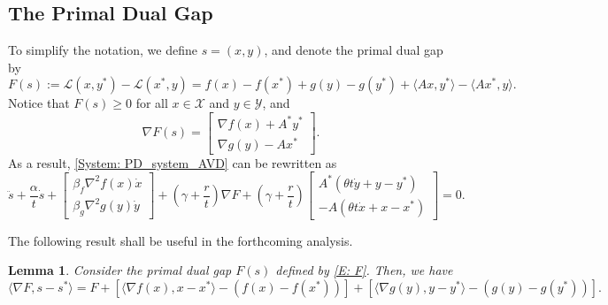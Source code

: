 \documentclass[pdflatex,sn-mathphys-num]{sn-jnl}
\theoremstyle{thmstyleone}
\newtheorem{lemma}[theorem]{Lemma}
\theoremstyle{thmstyletwo}
\theoremstyle{thmstylethree}
\newcommand{\X}{\mathcal{X}}
\newcommand{\Y}{\mathcal{Y}}
\begin{document}
\subsection{The Primal Dual Gap}\label{Subsec: F}
To simplify the notation, we define $s=(x,y)$, and denote the primal dual gap by 
\begin{equation}\label{E: F}
F(s):= \mathcal{L}(x,y^*) - \mathcal{L}(x^*,y) = f(x) - f(x^*) + g(y) - g(y^*) + \langle Ax, y^* \rangle - \langle Ax^*,y\rangle.
\end{equation}
Notice that $F(s)\ge 0$ for all $x\in\X$ and $y\in\Y$, and 
$$ \nabla F(s) = \begin{bmatrix}
\nabla f(x) + A^* y^*\\[2pt]
\nabla g(y) - Ax^*
\end{bmatrix}.$$ 
As a result, \eqref{System: PD_system_AVD} can be rewritten as
\begin{equation}\label{E: PD_system_AVD}
\ddot{s} + \frac{\alpha}{t} \dot{s} + \begin{bmatrix}
\beta_f \nabla^2 f(x) \dot{x}\\[2pt]
\beta_g \nabla^2 g(y) \dot{y}
\end{bmatrix} + \left( \gamma + \frac{r}{t} \right) \nabla F + \left( \gamma + \frac{r}{t} \right) \begin{bmatrix}
A^* ( \theta t \dot{y} + y - y^* ) \\[2pt]
- A( \theta t \dot{x} + x - x^* )
\end{bmatrix} = 0.
\end{equation}

The following result shall be useful in the forthcoming analysis.


\begin{lemma}\label{Lem: dF}
Consider the primal dual gap $F(s)$ defined by \eqref{E: F}. Then, we have
$$ \langle \nabla F, s-s^* \rangle = F + [ \langle \nabla f(x), x-x^* \rangle - \left( f(x) - f(x^*) \right) ]
  + [ \langle \nabla g(y), y-y^* \rangle - \left( g(y) - g(y^*) \right) ]. $$
\end{lemma} 
\end{document}
